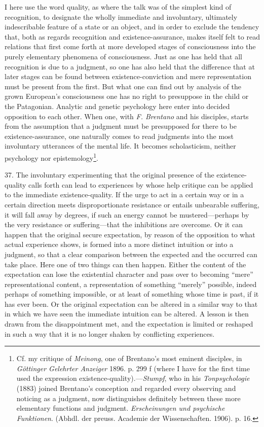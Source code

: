\documentclass[12pt,a4paper]{book}
\newcommand{\opage}[1]{\marginnote{\footnotesize\textit{[#1]}}}
\begin{document}
I here use the word quality, as where the talk was of \opage{102}the simplest kind of
recognition, to designate the wholly immediate and involuntary, ultimately
indescribable feature of a state or an object, and in order to exclude the
tendency that, both as regards recognition and existence-assurance, makes
itself felt to read relations that first come forth at more developed
stages of consciousness into the purely elementary phenomena of
consciousness. Just as one has held that all recognition is due to a
judgment, so one has also held that the difference that at later stages can
be found between existence-conviction and mere representation must be
present from the first. But what one can find out by analysis of the grown
European's consciousness one has no right to presuppose in the child or the
Patagonian. Analytic and genetic psychology here enter into decided
opposition to each other. When one, with \emph{F. Brentano} and his
disciples, starts from the assumption that a judgment must be presupposed
for there to be existence-assurance, one naturally comes to read judgments
into the most involuntary utterances of the mental life. It becomes
scholasticism, neither psychology nor epistemology\footnote{Cf. my
critique of \emph{Meinong}, one of Brentano's most eminent disciples, in
\emph{Göttinger Gelehrter Anzeiger} 1896. p. 299 f (where I have for the
first time used the expression existence-quality).---\emph{Stumpf}, who in
his \emph{Tonpsychologie} (1883) joined Brentano's conception and regarded
every observing and noticing as a judgment, now distinguishes definitely
between these more elementary functions and judgment. \emph{Erscheinungen
und psychische Funktionen}. (Abhdl. der preuss. Academie der
Wissenschaften. 1906). p. 16.}.

37. The involuntary experimenting that the original presence of the
existence-quality calls forth can lead to experiences by whose help
critique can be applied to the immediate existence-quality. If the urge to
act in a certain way or in a certain direction meets disproportionate
resistance or entails unbearable suffering, it will fall away by degrees,
if such an energy cannot be mustered---perhaps by the very resistance or
suffering---that the inhibitions are overcome. Or it can happen that the
original secure expectation, by reason of the opposition to what actual
experience shows, is formed into a more distinct intuition or into a
judgment, so that a clear comparison between the expected and the occurred
\opage{103}can take place. Here one of two things can then happen. Either the content
of the expectation can lose the existential character and pass over to
becoming ``mere'' representational content, a representation of something
``merely'' possible, indeed perhaps of something impossible, or at least of
something whose time is past, if it has ever been. Or the original
expectation can be altered in a similar way to that in which we have seen
the immediate intuition can be altered. A lesson is then drawn from the
disappointment met, and the expectation is limited or reshaped in such a
way that it is no longer shaken by conflicting experiences.
\end{document}
